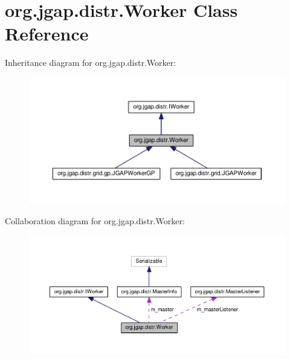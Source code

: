 \hypertarget{classorg_1_1jgap_1_1distr_1_1_worker}{\section{org.\-jgap.\-distr.\-Worker Class Reference}
\label{classorg_1_1jgap_1_1distr_1_1_worker}
}


Inheritance diagram for org.\-jgap.\-distr.\-Worker\-:
\nopagebreak
\begin{figure}[H]
\begin{center}
\leavevmode
\includegraphics[width=350pt]{classorg_1_1jgap_1_1distr_1_1_worker__inherit__graph}
\end{center}
\end{figure}


Collaboration diagram for org.\-jgap.\-distr.\-Worker\-:
\nopagebreak
\begin{figure}[H]
\begin{center}
\leavevmode
\includegraphics[width=350pt]{classorg_1_1jgap_1_1distr_1_1_worker__coll__graph}
\end{center}
\end{figure}
